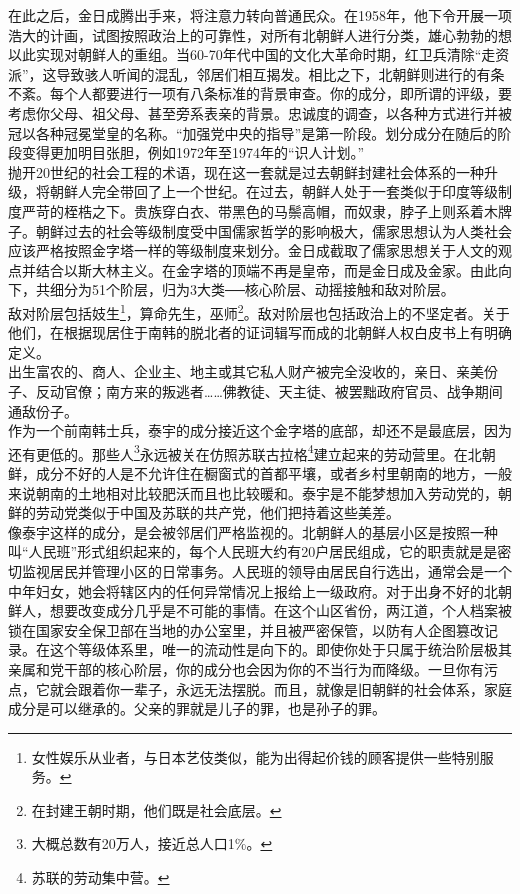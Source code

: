 在此之后，金日成腾出手来，将注意力转向普通民众。在1958年，他下令开展一项浩大的计画，试图按照政治上的可靠性，对所有北朝鲜人进行分类，雄心勃勃的想以此实现对朝鲜人的重组。当60-70年代中国的文化大革命时期，红卫兵清除“走资派”，这导致骇人听闻的混乱，邻居们相互揭发。相比之下，北朝鲜则进行的有条不紊。每个人都要进行一项有八条标准的背景审查。你的成分，即所谓的评级，要考虑你父母、祖父母、甚至旁系表亲的背景。忠诚度的调查，以各种方式进行并被冠以各种冠冕堂皇的名称。“加强党中央的指导”是第一阶段。划分成分在随后的阶段变得更加明目张胆，例如1972年至1974年的“识人计划。”\\

抛开20世纪的社会工程的术语，现在这一套就是过去朝鲜封建社会体系的一种升级，将朝鲜人完全带回了上一个世纪。在过去，朝鲜人处于一套类似于印度等级制度严苛的桎梏之下。贵族穿白衣、带黑色的马鬃高帽，而奴隶，脖子上则系着木牌子。朝鲜过去的社会等级制度受中国儒家哲学的影响极大，儒家思想认为人类社会应该严格按照金字塔一样的等级制度来划分。金日成截取了儒家思想关于人文的观点并结合以斯大林主义。在金字塔的顶端不再是皇帝，而是金日成及金家。由此向下，共细分为51个阶层，归为3大类──核心阶层、动摇接触和敌对阶层。\\

敌对阶层包括妓生\footnote{女性娱乐从业者，与日本艺伎类似，能为出得起价钱的顾客提供一些特别服务。}，算命先生，巫师\footnote{在封建王朝时期，他们既是社会底层。}。敌对阶层也包括政治上的不坚定者。关于他们，在根据现居住于南韩的脱北者的证词辑写而成的北朝鲜人权白皮书上有明确定义。\\

出生富农的、商人、企业主、地主或其它私人财产被完全没收的，亲日、亲美份子、反动官僚；南方来的叛逃者……佛教徒、天主徒、被罢黜政府官员、战争期间通敌份子。\\

作为一个前南韩士兵，泰宇的成分接近这个金字塔的底部，却还不是最底层，因为还有更低的。那些人\footnote{大概总数有20万人，接近总人口1\%。}永远被关在仿照苏联古拉格\footnote{苏联的劳动集中营。}建立起来的劳动营里。在北朝鲜，成分不好的人是不允许住在橱窗式的首都平壤，或者乡村里朝南的地方，一般来说朝南的土地相对比较肥沃而且也比较暖和。泰宇是不能梦想加入劳动党的，朝鲜的劳动党类似于中国及苏联的共产党，他们把持着这些美差。\\

像泰宇这样的成分，是会被邻居们严格监视的。北朝鲜人的基层小区是按照一种叫“人民班”形式组织起来的，每个人民班大约有20户居民组成，它的职责就是是密切监视居民并管理小区的日常事务。人民班的领导由居民自行选出，通常会是一个中年妇女，她会将辖区内的任何异常情况上报给上一级政府。对于出身不好的北朝鲜人，想要改变成分几乎是不可能的事情。在这个山区省份，两江道，个人档案被锁在国家安全保卫部在当地的办公室里，并且被严密保管，以防有人企图篡改记录。在这个等级体系里，唯一的流动性是向下的。即使你处于只属于统治阶层极其亲属和党干部的核心阶层，你的成分也会因为你的不当行为而降级。一旦你有污点，它就会跟着你一辈子，永远无法摆脱。而且，就像是旧朝鲜的社会体系，家庭成分是可以继承的。父亲的罪就是儿子的罪，也是孙子的罪。\\

